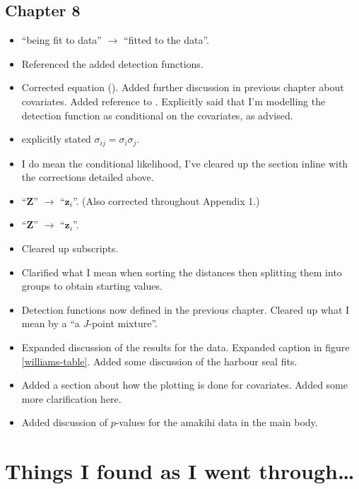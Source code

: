\subsection{Chapter 8}
\begin{itemize}
\item {} ``being fit to data'' $\rightarrow$ ``fitted to the data''.
\item {} Referenced the added detection functions.
\item {} Corrected equation (\label{mix-detfct}).  Added further discussion in previous chapter about covariates.  Added reference to \cite{covpaper}.  Explicitly said that I'm modelling the detection function as conditional on the covariates, as advised.
\item {} explicitly stated $\sigma_{ij}=\sigma_i\sigma_j$.
\item {} I do mean the conditional likelihood, I've cleared up the section inline with the corrections detailed above.
\item {} ``$\mathbf{Z}$'' $\rightarrow$ ``$\mathbf{z}_i$''. (Also corrected throughout Appendix 1.)
\item {} ``$\mathbf{Z}$'' $\rightarrow$ ``$\mathbf{z}_i$''.
\item {} Cleared up subscripts.
\item {} Clarified what I mean when sorting the distances then splitting them into groups to obtain starting values.
\item {} Detection functions now defined in the previous chapter.  Cleared up what I mean by a ``a $J$-point mixture''.
\item {} Expanded discussion of the results for the  data.  Expanded caption in figure \ref{williams-table}.  Added some discussion of the harbour seal fits.
\item {} Added a section about how the plotting is done for covariates.  Added some more clarification here.
\item {} Added discussion of $p$-values for the amakihi data in the main body.
\end{itemize}

\section{Things I found as I went through\dots}

